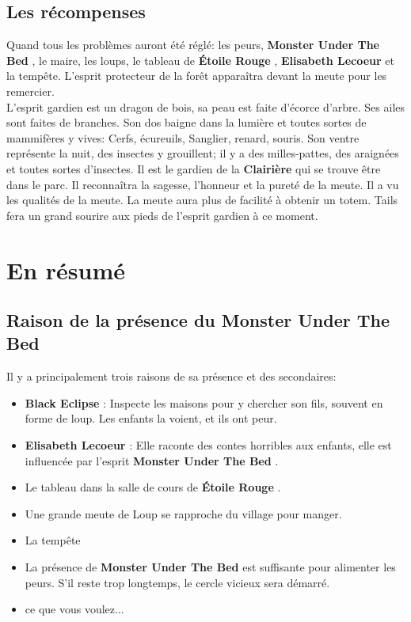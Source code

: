 \documentclass[oneside,12pt]{book}
\newcommand{\Lynn}{\textbf{Étoile Rouge} }
\newcommand{\Monster}{\textbf{Monster Under The Bed} }
\newcommand{\BlackEclipse}{\textbf{Black Eclipse} }
\newcommand{\Elisabeth}{\textbf{Elisabeth Lecoeur} }
\begin{document}
\begin{flushleft}
\section{Les récompenses}
Quand  tous les problèmes auront été réglé: les peurs, \Monster, le maire, les loups, le tableau de \Lynn ,  \Elisabeth et  la tempête. 
L'esprit protecteur de la forêt apparaîtra devant la meute pour les remercier. \\
L'esprit gardien est un dragon de bois, sa peau est faite d’écorce d'arbre. 
Ses ailes sont faites de branches. Son dos baigne dans la lumière et toutes sortes de mammifères y vives: 
Cerfs, écureuils, Sanglier, renard, souris. Son ventre représente la nuit, des insectes y grouillent; 
il y a des milles-pattes, des araignées et toutes sortes d'insectes.
Il est le gardien de la \textbf{Clairière} qui se trouve être dans le parc. 
Il reconnaîtra la sagesse, l'honneur et la pureté de la meute.
Il a vu les qualités de la meute. La meute aura plus de facilité à obtenir un totem.
Tails fera un grand sourire aux pieds de l'esprit gardien à ce moment.\\

\chapter{En résumé}

\section{Raison de la présence du \Monster}
Il y a principalement trois raisons de sa présence et des secondaires: 
\begin{itemize}
\item \BlackEclipse : Inspecte les maisons pour y chercher son fils, souvent en forme de loup. Les enfants la voient, et ils ont peur.
\item \Elisabeth : Elle raconte des contes horribles aux enfants, elle est influencée par l'esprit \Monster.
\item Le tableau dans la salle de cours de \Lynn. 
\item Une grande meute de Loup se rapproche du village pour manger.
\item La tempête
\item La présence de \Monster est suffisante pour alimenter les peurs. S'il reste trop longtemps, le cercle vicieux sera démarré. 
\item ce que vous voulez...
\end{itemize}


\end{flushleft}
\end{document}
